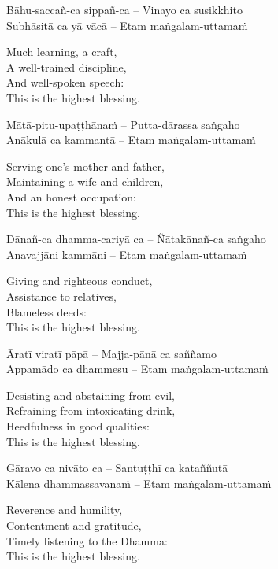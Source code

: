 Bāhu-saccañ-ca sippañ-ca – Vinayo ca susikkhito\\
Subhāsitā ca yā vācā – Etam maṅgalam-uttamaṁ

\begin{english-verses}
  Much learning, a craft,\\
  A well-trained discipline,\\
  And well-spoken speech:\\
  This is the highest blessing.
\end{english-verses}

Mātā-pitu-upaṭṭhānaṁ – Putta-dārassa saṅgaho\\
Anākulā ca kammantā – Etam maṅgalam-uttamaṁ

\begin{english-verses}
  Serving one's mother and father,\\
  Maintaining a wife and children,\\
  And an honest occupation:\\
  This is the highest blessing.
\end{english-verses}

Dānañ-ca dhamma-cariyā ca – Ñātakānañ-ca saṅgaho\\
Anavajjāni kammāni – Etam maṅgalam-uttamaṁ

\begin{english-verses}
  Giving and righteous conduct,\\
  Assistance to relatives,\\
  Blameless deeds:\\
  This is the highest blessing.
\end{english-verses}

Āratī viratī pāpā – Majja-pānā ca saññamo\\
Appamādo ca dhammesu – Etam maṅgalam-uttamaṁ

\begin{english-verses}
  Desisting and abstaining from evil,\\
  Refraining from intoxicating drink,\\
  Heedfulness in good qualities:\\
  This is the highest blessing.
\end{english-verses}

Gāravo ca nivāto ca – Santuṭṭhī ca kataññutā\\
Kālena dhammassavanaṁ – Etam maṅgalam-uttamaṁ

\begin{english-verses}
  Reverence and humility,\\
  Contentment and gratitude,\\
  Timely listening to the Dhamma:\\
  This is the highest blessing.
\end{english-verses}

